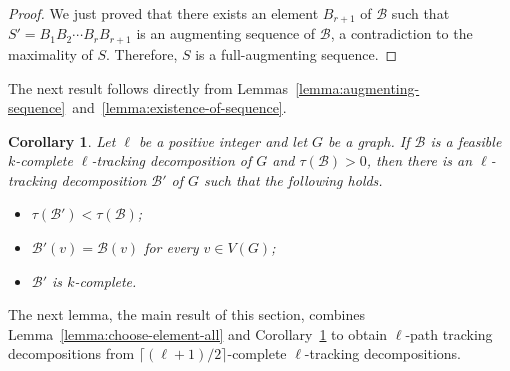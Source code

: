 \documentclass[12pt,reqno,a4paper]{amsart}
\newtheorem{corollary}[theorem]{Corollary}
\newcommand{\B}{\mathcal{B}}
\newcommand{\full}{full}
\begin{document}
\begin{proof}
	

	
	We just proved that there exists an element $B_{r+1}$ of $\B$ 
such that $S'=B_1B_2\cdots B_r B_{r+1}$ is 
	an augmenting sequence of \(\B\),
	a contradiction to the maximality of \(S\). 
	Therefore, \(S\) is a \full-augmenting sequence.
\end{proof}

The next result follows directly from Lemmas~\ref{lemma:augmenting-sequence}~and~\ref{lemma:existence-of-sequence}.

\begin{corollary}\label{cor:main}
	Let \(\ell\) be a positive integer and let \(G\) be a graph.
	If $\B$ is a feasible \(k\)-complete \(\ell\)-tracking decomposition of $G$
	and \(\tau(\B) > 0\),
	then there is an \(\ell\)-tracking decomposition \(\B'\) of \(G\) 
	such that the following holds.
	\begin{itemize}
	 \item \(\tau(\B') < \tau(\B)\);
	 \item \(\B'(v) = \B(v)\) for every $v\in V(G)$;
	 \item $\B'$ is \(k\)-complete.
	\end{itemize}
\end{corollary}


The next lemma, the main result of this section, combines
Lemma~\ref{lemma:choose-element-all} and Corollary~\ref{cor:main} to 
obtain \(\ell\)-path tracking decompositions
from  $\lceil(\ell +1)/2\rceil$-complete \(\ell\)-tracking decompositions.
\end{document}
